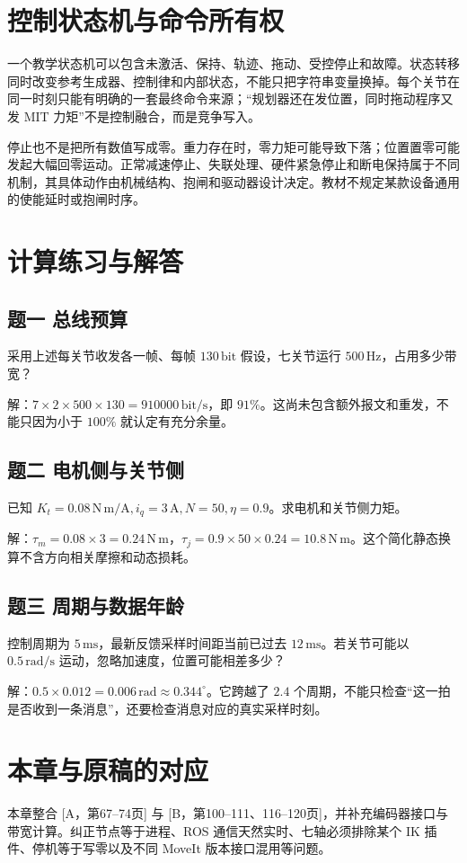 \section{控制状态机与命令所有权}

一个教学状态机可以包含未激活、保持、轨迹、拖动、受控停止和故障。状态转移同时改变参考生成器、控制律和内部状态，不能只把字符串变量换掉。每个关节在同一时刻只能有明确的一套最终命令来源；“规划器还在发位置，同时拖动程序又发 MIT 力矩”不是控制融合，而是竞争写入。

停止也不是把所有数值写成零。重力存在时，零力矩可能导致下落；位置置零可能发起大幅回零运动。正常减速停止、失联处理、硬件紧急停止和断电保持属于不同机制，其具体动作由机械结构、抱闸和驱动器设计决定。教材不规定某款设备通用的使能延时或抱闸时序。

\section{计算练习与解答}

\subsection*{题一 总线预算}
采用上述每关节收发各一帧、每帧 $130\,\mathrm{bit}$ 假设，七关节运行 $500\,\mathrm{Hz}$，占用多少带宽？

解：$7\times2\times500\times130=910000\,\mathrm{bit/s}$，即 $91\%$。这尚未包含额外报文和重发，不能只因为小于 $100\%$ 就认定有充分余量。

\subsection*{题二 电机侧与关节侧}
已知 $K_t=0.08\,\mathrm{N\,m/A},i_q=3\,\mathrm A,N=50,\eta=0.9$。求电机和关节侧力矩。

解：$\tau_m=0.08\times3=0.24\,\mathrm{N\,m}$，$\tau_j=0.9\times50\times0.24=10.8\,\mathrm{N\,m}$。这个简化静态换算不含方向相关摩擦和动态损耗。

\subsection*{题三 周期与数据年龄}
控制周期为 $5\,\mathrm{ms}$，最新反馈采样时间距当前已过去 $12\,\mathrm{ms}$。若关节可能以 $0.5\,\mathrm{rad/s}$ 运动，忽略加速度，位置可能相差多少？

解：$0.5\times0.012=0.006\,\mathrm{rad}\approx0.344^\circ$。它跨越了 $2.4$ 个周期，不能只检查“这一拍是否收到一条消息”，还要检查消息对应的真实采样时刻。

\section*{本章与原稿的对应}
本章整合 [A，第67--74页] 与 [B，第100--111、116--120页]，并补充编码器接口与带宽计算。纠正节点等于进程、ROS 通信天然实时、七轴必须排除某个 IK 插件、停机等于写零以及不同 MoveIt 版本接口混用等问题。
